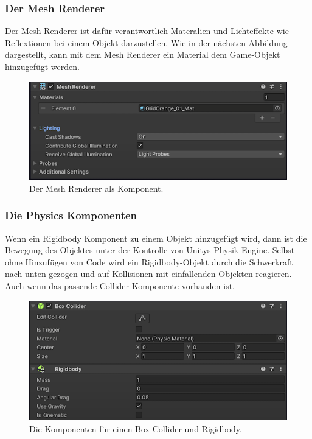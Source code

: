 \pagebreak

\subsubsection{Der Mesh Renderer}
Der Mesh Renderer ist dafür verantwortlich Materalien und Lichteffekte wie Reflextionen bei einem Objekt darzustellen. Wie in der nächsten Abbildung dargestellt, kann mit dem Mesh Renderer ein Material dem Game-Objekt hinzugefügt werden.\\
\noindent

\begin{figure}[H]
  \centering
  \includegraphics[width=0.7\linewidth]{chapters/14/Images/MeshRenderer.png}
  \caption{Der Mesh Renderer als Komponent.}
  \label{U03}
\end{figure}

\subsubsection{Die Physics Komponenten} 
Wenn ein Rigidbody Komponent zu einem Objekt hinzugefügt wird, dann ist die Bewegung des Objektes unter der Kontrolle von Unitys Physik Engine. Selbst ohne Hinzufügen von Code wird ein Rigidbody-Objekt durch die Schwerkraft nach unten gezogen und auf Kollisionen mit einfallenden Objekten reagieren. Auch wenn das passende Collider-Komponente vorhanden ist. \cite[][Rigidbody, Unity Documentation] {unitydocRigidbody} \\ 

\noindent

\begin{figure}[H]
  \centering
  \includegraphics[width=0.7\linewidth]{chapters/14/Images/Physics.png}
  \caption{Die Komponenten für einen Box Collider und Rigidbody.}
  \label{U04}
\end{figure}

